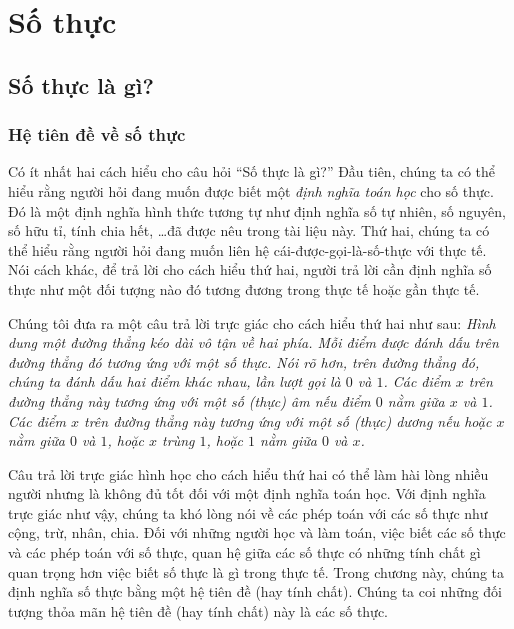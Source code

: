 \chapter{Số thực}\label{chapter:real-numbers}

\section{Số thực là gì?}

\subsection{Hệ tiên đề về số thực}

Có ít nhất hai cách hiểu cho câu hỏi ``Số thực là gì?\@'' Đầu tiên, chúng ta có thể hiểu rằng người hỏi đang muốn được biết một \textit{định nghĩa toán học} cho số thực. Đó là một định nghĩa hình thức tương tự như định nghĩa số tự nhiên, số nguyên, số hữu tỉ, tính chia hết, \ldots đã được nêu trong tài liệu này. Thứ hai, chúng ta có thể hiểu rằng người hỏi đang muốn liên hệ cái-được-gọi-là-số-thực với thực tế. Nói cách khác, để trả lời cho cách hiểu thứ hai, người trả lời cần định nghĩa số thực như một đối tượng nào đó tương đương trong thực tế hoặc gần thực tế.

Chúng tôi đưa ra một câu trả lời trực giác cho cách hiểu thứ hai như sau: \textit{Hình dung một đường thẳng kéo dài vô tận về hai phía. Mỗi điểm được đánh dấu trên đường thẳng đó tương ứng với một số thực. Nói rõ hơn, trên đường thẳng đó, chúng ta đánh dấu hai điểm khác nhau, lần lượt gọi là $0$ và $1$. Các điểm $x$ trên đường thẳng này tương ứng với một số (thực) âm nếu điểm $0$ nằm giữa $x$ và $1$. Các điểm $x$ trên đường thẳng này tương ứng với một số (thực) dương nếu hoặc $x$ nằm giữa $0$ và $1$, hoặc $x$ trùng $1$, hoặc $1$ nằm giữa $0$ và $x$.}

Câu trả lời trực giác hình học cho cách hiểu thứ hai có thể làm hài lòng nhiều người nhưng là không đủ tốt đối với một định nghĩa toán học. Với định nghĩa trực giác như vậy, chúng ta khó lòng nói về các phép toán với các số thực như cộng, trừ, nhân, chia. Đối với những người học và làm toán, việc biết các số thực và các phép toán với số thực, quan hệ giữa các số thực có những tính chất gì quan trọng hơn việc biết số thực là gì trong thực tế. Trong chương này, chúng ta định nghĩa số thực bằng một hệ tiên đề (hay tính chất). Chúng ta coi những đối tượng thỏa mãn hệ tiên đề (hay tính chất) này là các số thực.

